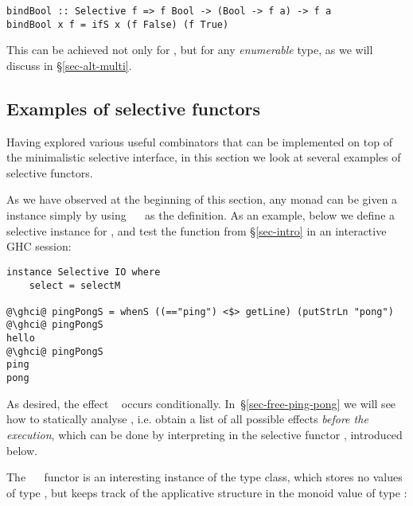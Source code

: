 {\vspace{1mm}
\begin{verbatim}
bindBool :: Selective f => f Bool -> (Bool -> f a) -> f a
bindBool x f = ifS x (f False) (f True)
\end{verbatim}
\vspace{1mm}

\noindent
This can be achieved not only for , but for any \emph{enumerable}
type, as we will discuss in \S\ref{sec-alt-multi}.

\subsection{Examples of selective functors}\label{sec-instances}

Having explored various useful combinators that can be implemented on top of the
minimalistic selective interface, in this section we look at several examples of
selective functors.

As we have observed at the beginning of this section, any monad can be given a
 instance simply by using ~\hs{=}~ as the
definition. As an example, below we define a selective instance for , and
test the function  from \S\ref{sec-intro} in an interactive GHC
session:

\vspace{1mm}
\begin{verbatim}
instance Selective IO where
    select = selectM

@\ghci@ pingPongS = whenS ((=="ping") <$> getLine) (putStrLn "pong")
@\ghci@ pingPongS
hello
@\ghci@ pingPongS
ping
pong
\end{verbatim}
\vspace{1mm}

\noindent
As desired, the effect ~ occurs conditionally.
In~\S\ref{sec-free-ping-pong} we will see how to statically analyse
, i.e. obtain a list of all possible effects \emph{before the
execution}, which can be done by interpreting  in the selective
functor , introduced below.

The ~~ functor is an interesting instance of the
 type class, which stores no values of type , but keeps
track of the applicative structure in the monoid value of type :

}

